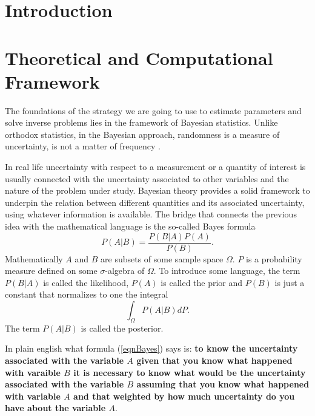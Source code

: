\documentclass[12pt]{book}
\begin{document}
\chapter{Introduction}

\newpage

\chapter{Theoretical and Computational Framework}


The foundations of the strategy we are going to use  to estimate parameters and solve inverse problems
  lies in the 
framework of Bayesian statistics. Unlike orthodox statistics, in the Bayesian approach, randomness
is a measure of uncertainty, is not a matter of frequency \cite{jaynes2003probability}. 


In real life uncertainty with respect to a measurement or a quantity of interest is usually 
connected  with the uncertainty associated to other variables and the nature of  the 
problem under study. Bayesian theory provides a solid framework to underpin the relation between
different quantities and its associated uncertainty, using whatever information
is available. The bridge that connects the previous idea
with the mathematical language is the so-called Bayes formula 
\begin{equation}\label{eqnBayes}
P(A|B)=\frac{P(B|A)P(A)}{P(B)}.
\end{equation}
Mathematically  $A$ and $B$   are subsets of some sample space $\Omega$.
$P$ is a probability measure defined on some $\sigma$-algebra of  $\Omega$.
To introduce  some language, the term $P(B|A)$ is called the likelihood, $P(A)$ is called the prior and
$P(B)$ is just a constant that normalizes to one the integral
\begin{equation*}
\int_{\Omega} P(A|B)dP.
\end{equation*}
The term $P(A|B)$ is called the posterior.

 In plain
english what formula (\ref{eqnBayes}) says is: \textbf{to know the uncertainty associated with the variable $A$
given that you know what happened with varaible $B$ it is necessary to know what would be the uncertainty
associated with the variable $B$ assuming that you know what happened with variable $A$ and that
weighted by how much uncertainty do you have about the variable $A$}.
\newline
\end{document}
